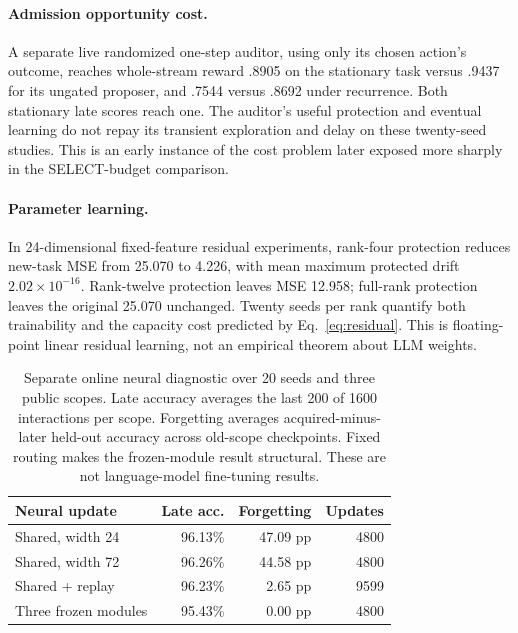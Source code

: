\documentclass[10pt,twocolumn]{article}
\begin{document}
\paragraph{Admission opportunity cost.}
A separate live randomized one-step auditor, using only its chosen action's
outcome, reaches whole-stream reward .8905 on the stationary task versus .9437
for its ungated proposer, and .7544 versus .8692 under recurrence. Both stationary
late scores reach one. The auditor's useful protection and eventual learning do
not repay its transient exploration and delay on these twenty-seed studies.
This is an early instance of the cost problem later exposed more sharply in the
SELECT-budget comparison.

\paragraph{Parameter learning.}
In 24-dimensional fixed-feature residual experiments, rank-four protection
reduces new-task MSE from 25.070 to 4.226, with mean maximum protected drift
$2.02\times10^{-16}$. Rank-twelve protection leaves MSE 12.958; full-rank
protection leaves the original 25.070 unchanged. Twenty seeds per rank quantify
both trainability and the capacity cost predicted by Eq.~\eqref{eq:residual}.
This is floating-point linear residual learning, not an empirical theorem about
LLM weights.

\begin{table}[t]
\centering\small\setlength{\tabcolsep}{4pt}
\begin{tabular}{lrrr}
\toprule
Neural update & Late acc. & Forgetting & Updates\\
\midrule
Shared, width 24 & 96.13\% & 47.09 pp & 4800\\
Shared, width 72 & 96.26\% & 44.58 pp & 4800\\
Shared + replay & 96.23\% & 2.65 pp & 9599\\
Three frozen modules & 95.43\% & 0.00 pp & 4800\\
\bottomrule
\end{tabular}
\caption{Separate online neural diagnostic over 20 seeds and three public
scopes. Late accuracy averages the last 200 of 1600 interactions per scope.
Forgetting averages acquired-minus-later held-out accuracy across old-scope
checkpoints. Fixed routing
makes the frozen-module result structural. These are not language-model
fine-tuning results.}\label{tab:neural}
\end{table}
\end{document}

